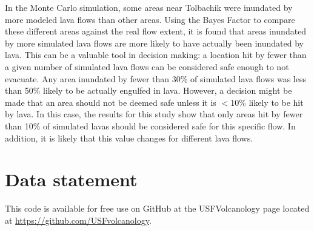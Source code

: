 	In the Monte Carlo simulation, some areas near Tolbachik were inundated by more modeled lava flows than other areas. Using the Bayes Factor to compare these different areas against the real flow extent, it is found that areas inundated by more simulated lava flows are more likely to have actually been inundated by lava. This can be a valuable tool in decision making: a location hit by fewer than a given number of simulated lava flows can be considered safe enough to not evacuate. Any area inundated by fewer than 30\% of simulated lava flows was less than 50\% likely to be actually engulfed in lava. However, a decision might be made that an area should not be deemed safe unless it is $<$10\% likely to be hit by lava. In this case, the results for this study show that only areas hit by fewer than 10\% of simulated lavas should be considered safe for this specific flow. In addition, it is likely that this value changes for different lava flows.
	
	
\section{Data statement}
This code is available for free use on GitHub at the USFVolcanology page located at \url{https://github.com/USFvolcanology}.

